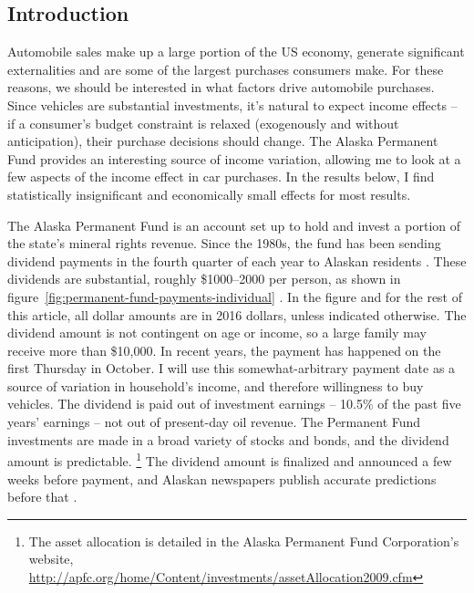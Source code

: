 \documentclass[11pt,letterpaper,oneside]{article}
\begin{document}
\pagebreak
\setcounter{page}{1}
\begin{doublespacing}
\section{Introduction}

Automobile sales make up a large portion of the US economy, generate significant externalities and are some of the largest purchases consumers make.
For these reasons, we should be interested in what factors drive automobile purchases.
Since vehicles are substantial investments, it's natural to expect income effects -- if a consumer's budget constraint is relaxed (exogenously and without anticipation), their purchase decisions should change.
The  Alaska Permanent Fund provides an interesting source of income variation, allowing me to look at a few aspects of the income effect in car purchases.
In the results below, I find statistically insignificant and economically small effects for most results.

The Alaska Permanent Fund is an account set up to hold and invest a portion of the state's mineral rights revenue.
Since the 1980s, the fund has been sending dividend payments in the fourth quarter of each year to Alaskan residents \parencite{hsieh2003}.
These dividends are substantial, roughly \$1000--2000 per person, as shown in figure~\ref{fig:permanent-fund-payments-individual} \parencite{apfd_payments_summary}.
In the figure and for the rest of this article, all dollar amounts are in 2016 dollars, unless indicated otherwise.
The dividend amount is not contingent on age or income, so a large family may receive more than \$10,000.
In recent years, the payment has happened on the first Thursday in October.
I will use this somewhat\hyp{}arbitrary payment date as a source of variation in household's income, and therefore willingness to buy vehicles.
The dividend is paid out of investment earnings -- 10.5\% of the past five years' earnings -- not out of present\hyp{}day oil revenue.
The Permanent Fund investments are made in a broad variety of stocks and bonds, and the dividend amount is predictable.
\footnote{The asset allocation is detailed in the Alaska Permanent Fund Corporation's website, \url{http://apfc.org/home/Content/investments/assetAllocation2009.cfm}}
The dividend amount is finalized and announced a few weeks before payment, and Alaskan newspapers publish accurate predictions before that \parencite{adn_dividend_prediction, adn_dividend_realization}.


\end{doublespacing}
\end{document}
